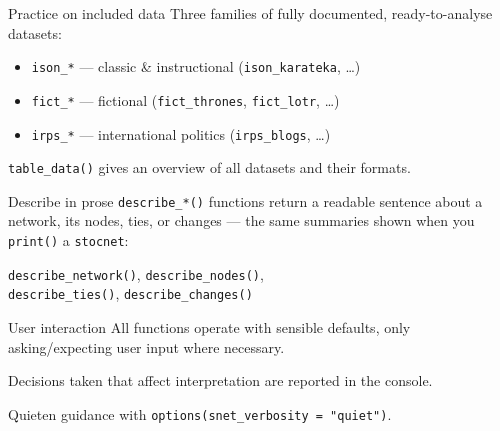 \documentclass[9pt]{extarticle}
\let\code\verb
\begin{document}
\begin{minipage}[t]{0.323\textwidth}
\begin{mnbox}{Practice on included data}
Three families of fully documented, ready-to-analyse datasets:
\begin{itemize}
\item \code|ison_*| — classic \& instructional (\code|ison_karateka|, \ldots)
\item \code|fict_*| — fictional (\code|fict_thrones|, \code|fict_lotr|, \ldots)
\item \code|irps_*| — international politics (\code|irps_blogs|, \ldots)
\end{itemize}
\code|table_data()| gives an overview of all datasets and their formats.
\end{mnbox}

\begin{mnbox}{Describe in prose}
\code|describe_*()| functions return a readable sentence about a network,
its nodes, ties, or changes — the same summaries shown when you \code|print()| a
\code|stocnet|:
\begin{center}
\code|describe_network()|, \code|describe_nodes()|,\\
\code|describe_ties()|, \code|describe_changes()|
\end{center}
\end{mnbox}

\begin{greybox}{User interaction}
All functions operate with sensible defaults, only asking/expecting user input where necessary.

Decisions taken that affect interpretation are reported in the console.

Quieten guidance with \code|options(snet_verbosity = "quiet")|.
\end{greybox}

\end{minipage}\hfill
%
\end{document}
